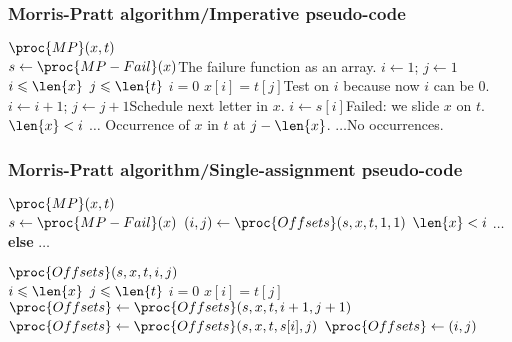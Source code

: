 %
\begin{frame}
\frametitle{Morris-Pratt algorithm/Imperative pseudo-code}

{\small
\begin{codebox}
\(\proc{MP} (x, t)\)\\
\li \(s \gets \proc{MP-Fail} (x)\)\>\>\>\>\>\>\>\>\>\>\Comment The failure function as an array.
\li \(i \gets 1\); \(j \gets 1\)
\li \While \(i \leqslant \len{x}\) \LogAnd \(j \leqslant \len{t}\)
\li \Do \If \(i = 0\) \LogOr \(x[i] = t[j]\)\>\>\>\>\>\>\>\>\Comment Test on \(i\) because now \(i\) can be 0.
\li	  \Then \(i \gets i + 1\); \(j \gets j + 1\)\>\>\>\>\>\>\Comment Schedule next letter in \(x\).
\li	  \Else \(i \gets s[i]\)\>\>\>\>\>\>\Comment Failed: we slide \(x\) on \(t\). 
          \End 
    \End
\li \If \(\len{x} < i\) 
\li \Then \(\ldots\) \>\>\>\>\>\>\>\>\Comment Occurrence of \(x\) in \(t\) at \(j - \len{x}\).
\li \Else \(\ldots\)\>\>\>\>\>\>\>\>\Comment No occurrences. 
    \End
\end{codebox}
}

\end{frame}

%
\begin{frame}
\frametitle{Morris-Pratt algorithm/Single-assignment pseudo-code}
 
\begin{codebox}
\(\proc{MP} (x, t)\)\\
\li \(s \gets \proc{MP-Fail} (x)\)
\li \((i, j) \gets \proc{Offsets} (s,x,t,1,1)\)
\li \If \(\len{x} < i\) 
\li \Then \(\ldots\) \textbf{else} \(\ldots\)
    \End
\end{codebox}
\begin{codebox}
\(\proc{Offsets} (s,x,t,i,j)\)\\
\li \If \(i \leqslant \len{x}\) \LogAnd \(j \leqslant \len{t}\)
\li \Then \If \(i = 0\) \LogOr \(x[i] = t[j]\)
\li	      \Then \(\proc{Offsets} \gets \proc{Offsets} (s, x, t, i+1, j+1)\)
\li       \Else \(\proc{Offsets} \gets \proc{Offsets} (s, x, t, s[i], j)\)
          \End
\li	\Else \(\proc{Offsets} \gets (i, j)\)
    \End
\end{codebox}

\end{frame}

